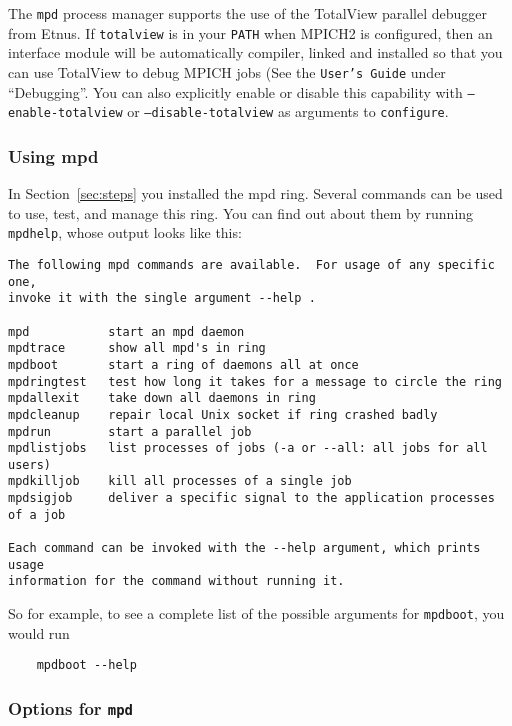 \documentclass[dvipdfm,11pt]{article}
\begin{document}
The \texttt{mpd} process manager supports the use of the TotalView
parallel debugger from Etnus.  If \texttt{totalview} is in your
\texttt{PATH} when MPICH2 is configured, then an interface module will
be automatically compiler, linked and installed so that you can use
TotalView to debug MPICH jobs (See the \texttt{User's Guide} under
``Debugging''.  You can also explicitly enable or disable this
capability with \texttt{--enable-totalview} or
\texttt{--disable-totalview} as arguments to \texttt{configure}.

\subsubsection{Using mpd}
\label{sec:using-mpd}

In Section~\ref{sec:steps} you installed the mpd ring.  Several commands
can be used to use, test, and manage this ring.  You can find out about
them by running \texttt{mpdhelp}, whose output looks like this:

\begin{small}
\begin{verbatim}
The following mpd commands are available.  For usage of any specific one,
invoke it with the single argument --help .

mpd           start an mpd daemon
mpdtrace      show all mpd's in ring
mpdboot       start a ring of daemons all at once
mpdringtest   test how long it takes for a message to circle the ring 
mpdallexit    take down all daemons in ring
mpdcleanup    repair local Unix socket if ring crashed badly
mpdrun        start a parallel job
mpdlistjobs   list processes of jobs (-a or --all: all jobs for all users)
mpdkilljob    kill all processes of a single job
mpdsigjob     deliver a specific signal to the application processes of a job

Each command can be invoked with the --help argument, which prints usage
information for the command without running it.
\end{verbatim}
\end{small}
So for example, to see a complete list of the possible arguments for
\texttt{mpdboot}, you would run
\begin{verbatim}
    mpdboot --help
\end{verbatim}


\subsubsection{Options for \texttt{mpd}}
\end{document}
